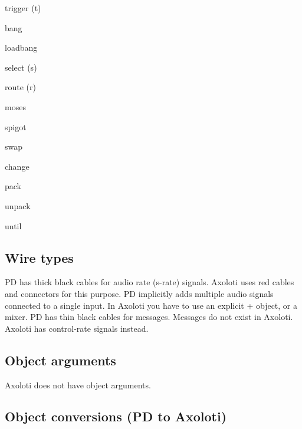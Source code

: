 \begin{DoxyItemize}
\item trigger (t) 
\item bang 
\item loadbang 
\item select (s) 
\item route (r) 
\item moses 
\item spigot 
\item swap 
\item change 
\item pack 
\item unpack 
\item until 
\end{DoxyItemize}\hypertarget{md_pd_user_pd_user_wire_types}{}\subsection{Wire types}\label{md_pd_user_pd_user_wire_types}
PD has thick black cables for audio rate (s-\/rate) signals. Axoloti uses red cables and connectors for this purpose. PD implicitly adds multiple audio signals connected to a single input. In Axoloti you have to use an explicit + object, or a mixer. PD has thin black cables for messages. Messages do not exist in Axoloti. Axoloti has control-\/rate signals instead.\hypertarget{md_pd_user_pd_user_object_arguments}{}\subsection{Object arguments}\label{md_pd_user_pd_user_object_arguments}
Axoloti does not have object arguments.\hypertarget{md_pd_user_pd_user_object_conversions}{}\subsection{Object conversions (\+P\+D to Axoloti)}\label{md_pd_user_pd_user_object_conversions}

